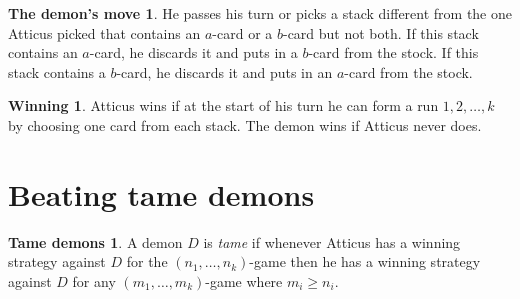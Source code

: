 \documentclass[12pt]{article}
\theoremstyle{plain}
\theoremstyle{definition}
\newtheorem*{demon}{The demon's move}
\newtheorem*{winning}{Winning}
\newtheorem*{tame}{Tame demons}
\theoremstyle{remark}
\begin{document}
\begin{demon}
He passes his turn or picks a stack different from the one Atticus picked that contains an $a$-card or a $b$-card but not both.  If this stack contains an $a$-card, he discards it and puts in a $b$-card from the stock.  If this stack contains a $b$-card, he discards it and puts in an $a$-card from the stock.
\end{demon}

\begin{winning}
Atticus wins if at the start of his turn he can form a run $1, 2, \ldots, k$ by choosing one card from each stack.  The demon wins if Atticus never does.
\end{winning}

\section{Beating tame demons}
\begin{tame}
A demon $D$ is \emph{tame} if whenever Atticus has a winning strategy against $D$ for the $(n_1, \ldots, n_k)$-game then he has a winning strategy against $D$ for any $(m_1, \ldots, m_k)$-game where $m_i \geq n_i$.
\end{tame}
\end{document}

